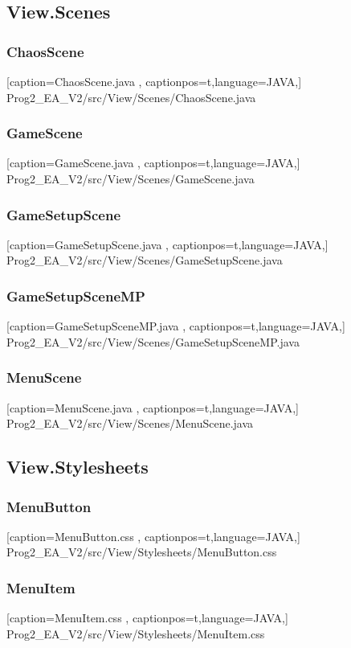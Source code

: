 \documentclass[a4paper,12pt]{scrartcl}
\begin{document}
	\subsection{View.Scenes}
	\subsubsection{ChaosScene}
	
	[caption={ChaosScene.java}
	\label{lst:javaclass},
	captionpos=t,language=JAVA,]
	{Prog2_EA_V2/src/View/Scenes/ChaosScene.java}
	\subsubsection{GameScene}
	
	[caption={GameScene.java}
	\label{lst:javaclass},
	captionpos=t,language=JAVA,]
	{Prog2_EA_V2/src/View/Scenes/GameScene.java}
	\subsubsection{GameSetupScene}
	
	[caption={GameSetupScene.java}
	\label{lst:javaclass},
	captionpos=t,language=JAVA,]
	{Prog2_EA_V2/src/View/Scenes/GameSetupScene.java}
	\subsubsection{GameSetupSceneMP}
	
	[caption={GameSetupSceneMP.java}
	\label{lst:javaclass},
	captionpos=t,language=JAVA,]
	{Prog2_EA_V2/src/View/Scenes/GameSetupSceneMP.java}
	\subsubsection{MenuScene}
	
	[caption={MenuScene.java}
	\label{lst:javaclass},
	captionpos=t,language=JAVA,]
	{Prog2_EA_V2/src/View/Scenes/MenuScene.java}
	\subsection{View.Stylesheets}
	\subsubsection{MenuButton}
	
	[caption={MenuButton.css}
	\label{lst:javaclass},
	captionpos=t,language=JAVA,]
	{Prog2_EA_V2/src/View/Stylesheets/MenuButton.css}
	\subsubsection{MenuItem}
	
	[caption={MenuItem.css}
	\label{lst:javaclass},
	captionpos=t,language=JAVA,]
	{Prog2_EA_V2/src/View/Stylesheets/MenuItem.css}
\end{document}
